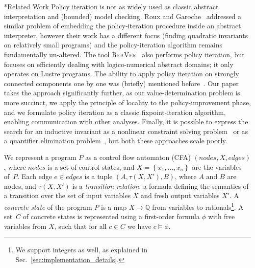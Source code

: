 \documentclass{llncs}
\makeatletter
\newcommand{\setof}[1]{\ensuremath{\left \{{#1}\right\}}}
\newcommand{\tuple}[1]{\ensuremath{\left( #1 \right) }}
\newcommand{\cfa}{\textsc{CFA}\xspace}
\renewcommand{\paragraph}{\@startsection{paragraph}{4}{\z@}{0.8ex \@plus 0ex \@minus 1ex}{-1em}{\normalfont\normalsize\bfseries}}
\newlength{\sectionspace}
\renewcommand\section{\@startsection{section}{1}{\z@}{-18\sectionspace \@plus -4\sectionspace \@minus -4\sectionspace}{12\sectionspace \@plus 4\sectionspace \@minus 4\sectionspace}{\normalfont\large\bfseries\boldmath
                        \rightskip=\z@ \@plus 8em\pretolerance=10000 }}
\makeatother
\begin{document}
\paragraph*{Related Work}
Policy iteration is not as widely used as classic abstract interpretation and (bounded) model checking.
Roux and Garoche~\cite{roux_policy_iteration_integration} addressed
a similar problem of embedding the policy-iteration procedure inside an
abstract interpreter, however their work has a different focus (finding
quadratic invariants on relatively small programs)
and the policy-iteration algorithm remains fundamentally un-altered.
The tool \textsc{ReaVer}~\cite{ReaVer} also performs policy iteration, but focuses on
efficiently dealing with logico-numerical abstract domains; it only
operates on Lustre programs.
The ability to apply policy iteration on strongly connected components one
by one was (briefly) mentioned before~\cite{pi_separate_scc}.
Our paper takes the approach significantly further, as our value-determination problem is
more succinct, we apply the principle of
locality to the policy-improvement phase, and we formulate policy iteration as
a classic fixpoint-iteration algorithm, enabling communication with other
analyses.
Finally, it is possible to express the search for an inductive invariant
as a nonlinear constraint solving problem~\cite{direct_invariant_generation} or
as a quantifier elimination problem~\cite{Monniaux_LMCS10}, but both these
approaches scale poorly.

\section{Background}
\label{sec:background}
We represent a program $P$ as a control flow automaton (\cfa)
$\tuple{\mathit{nodes}, X, \mathit{edges}}$, where $\mathit{nodes}$ is a set of control
states, and $X = \setof{x_1,\dots,x_n}$ are the variables of~$P$.
Each edge $e \in \mathit{edges}$  is a tuple $\tuple{A, \tau(X, X'), B}$, where
$A$ and $B$ are nodes,
and $\tau(X, X')$ is a \emph{transition relation}: a formula
defining the semantics of a transition over the set of input variables $X$ and fresh output variables $X'$.
A \emph{concrete state} of the program $P$ is a map $X \to \mathbb{Q}$ from
variables to rationals\footnote{We support integers as well, as explained in Sec.~\ref{sec:implementation_details}.}.
A set~$C$ of concrete states is represented using a first-order formula $\phi$ with
free variables from $X$, such that for all $c \in C$ we have $c \models \phi$.
\end{document}
